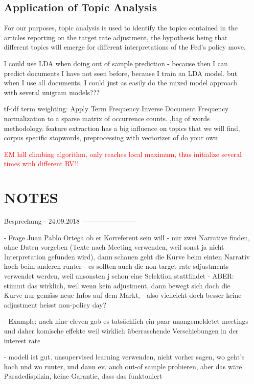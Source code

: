 \documentclass[11pt,a4paper,english,oneside]{book}
\numberwithin{equation}{chapter}
\begin{document}
\subsection{Application of Topic Analysis}
For our purposes, topic analysis is used to identify the topics contained in the articles reporting on the target rate adjustment, the hypothesis being that different topics will emerge for different interpretations of the Fed's policy move. 

I could use LDA when doing out of sample prediction - because then I can predict documents I have not seen before, because I train an LDA model, but when I use all documents, I could just as easily do the mixed model approach with several unigram models???

tf-idf term weighting: Apply Term Frequency Inverse Document Frequency normalization to a sparse matrix of occurrence counts. ,bag of words methodology, feature extraction has a big influence on topics that we will find, corpus specific stopwords, preprocessing with vectorizer of do your own

\textcolor{red}{EM hill climbing algorithm, only reaches local maximum, thus initialize several times with different RV!! }

\section{NOTES}
Besprechung - 24.09.2018
------------------------

- Frage Juan Pablo Ortega ob er Korreferent sein will
- nur zwei Narrative finden, ohne Daten vorgeben (Texte nach Meeting verwenden, weil sonst ja nicht Interpretation gefunden wird), dann schauen geht die Kurve beim einten Narrativ hoch beim anderen runter
- es sollten auch die non-target rate sdjustments verwendet werden, weil ansonsten j schon eine Selektion stattfindet - ABER: stimmt das wirklich, weil wenn kein adjustment, dann bewegt sich doch die Kurve nur gemäss neue Infos auf dem Markt, - also vielleicht doch besser keine adjustment heisst non-policy day?

- Example: nach nine eleven gab es tatsächlich ein paar unangemeldetet meetings und daher komische effekte weil wirklich überraschende Verschiebungen in der interest rate

- modell ist gut, unsupervised learning verwenden, nicht vorher sagen, wo geht's hoch und wo runter, und dann ev. auch out-of sample probieren, aber das wäre Paradedisplizin, keine Garantie, dass das funktoniert
\end{document}
